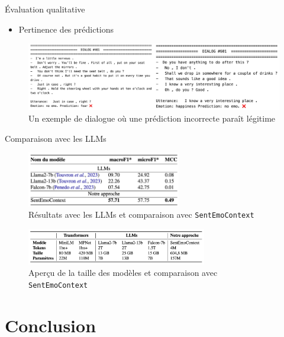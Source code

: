\documentclass[11pt,aspectratio=169]{beamer}
\begin{document}
\begin{frame}{Évaluation qualitative}
    \begin{itemize}
        \item Pertinence des prédictions
    \end{itemize}
    \begin{figure}[h]
        \centering
        \includegraphics[width=\textwidth]{gp.png}
        \caption{\centering Un exemple de dialogue où une prédiction incorrecte paraît légitime}
    \end{figure}
\end{frame}

\begin{frame}{Comparaison avec les LLMs}
    \begin{figure}
        \centering
        \includegraphics[width=0.6\textwidth]{resultats_llms.png}
        \caption{\centering Résultats avec les LLMs et comparaison avec \texttt{SentEmoContext}}
    \end{figure}
    \begin{figure}
        \centering
        \includegraphics[width=0.7\textwidth]{taille_llms.png}
        \caption{\centering Aperçu de la taille des modèles et comparaison avec \texttt{SentEmoContext}}
    \end{figure}
\end{frame}

\section{Conclusion}
\end{document}
